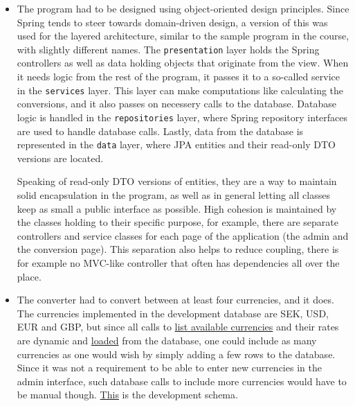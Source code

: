 \documentclass[a4paper]{scrartcl}
\def\code#1{\texttt{#1}}
\begin{document}
\begin{itemize}
    \item The program had to be designed using object-oriented design principles. Since Spring tends to steer towards domain-driven design, a version of this was used for the layered architecture, similar to the sample program in the course, with slightly different names. The \code{presentation} layer holds the Spring controllers as well as data holding objects that originate from the view. When it needs logic from the rest of the program, it passes it to a so-called service in the \code{services} layer. This layer can make computations like calculating the conversions, and it also passes on necessery calls to the database. Database logic is handled in the \code{repositories} layer, where Spring repository interfaces are used to handle database calls. Lastly, data from the database is represented in the \code{data} layer, where JPA entities and their read-only DTO versions are located.

        Speaking of read-only DTO versions of entities, they are a way to maintain solid encapsulation in the program, as well as in general letting all classes keep as small a public interface as possible. High cohesion is maintained by the classes holding to their specific purpose, for example, there are separate controllers and service classes for each page of the application (the admin and the conversion page). This separation also helps to reduce coupling, there is for example no MVC-like controller that often has dependencies all over the place.

    \item The converter had to convert between at least four currencies, and it does. The currencies implemented in the development database are SEK, USD, EUR and GBP, but since all calls to \href{https://github.com/fongie/CurrencyConverter/blob/master/currencyconverter/src/main/resources/templates/convert.html#L40}{list available currencies} and their rates are dynamic and \href{https://github.com/fongie/CurrencyConverter/blob/master/currencyconverter/src/main/java/se/kth/korlinge/currencyconverter/services/ConvertService.java#L70}{loaded} from the database, one could include as many currencies as one would wish by simply adding a few rows to the database. Since it was not a requirement to be able to enter new currencies in the admin interface, such database calls to include more currencies would have to be manual though. \href{https://github.com/fongie/CurrencyConverter/blob/master/currencyconverter/src/main/resources/schema.sql}{This} is the development schema.


\end{itemize}
\end{document}
